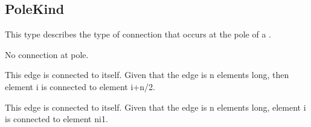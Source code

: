 \documentclass[letterpaper,10pt,english]{sphinxmanual}
\begin{document}
\subsection{PoleKind}
\label{\detokenize{PoleKind:polekind}}\label{\detokenize{PoleKind::doc}}

\begin{fulllineitems}
\label{\detokenize{PoleKind:ESMF.api.constants.PoleKind}}
This type describes the type of connection that occurs at the pole of a  
{\hyperref[\detokenize{grid:ESMF.api.grid.Grid}]{}}.

\begin{fulllineitems}
\label{\detokenize{PoleKind:ESMF.api.constants.PoleKind.NONE}}
No connection at pole.

\end{fulllineitems}


\begin{fulllineitems}
\label{\detokenize{PoleKind:ESMF.api.constants.PoleKind.MONOPOLE}}
This edge is connected to itself. Given that the edge is n elements long, 
then element i is connected to element i+n/2.

\end{fulllineitems}


\begin{fulllineitems}
\label{\detokenize{PoleKind:ESMF.api.constants.PoleKind.BIPOLE}}
This edge is connected to itself. Given that the edge is n elements long, element i is connected to element n\sphinxhyphen{}i\sphinxhyphen{}1.

\end{fulllineitems}


\end{fulllineitems}
\end{document}
